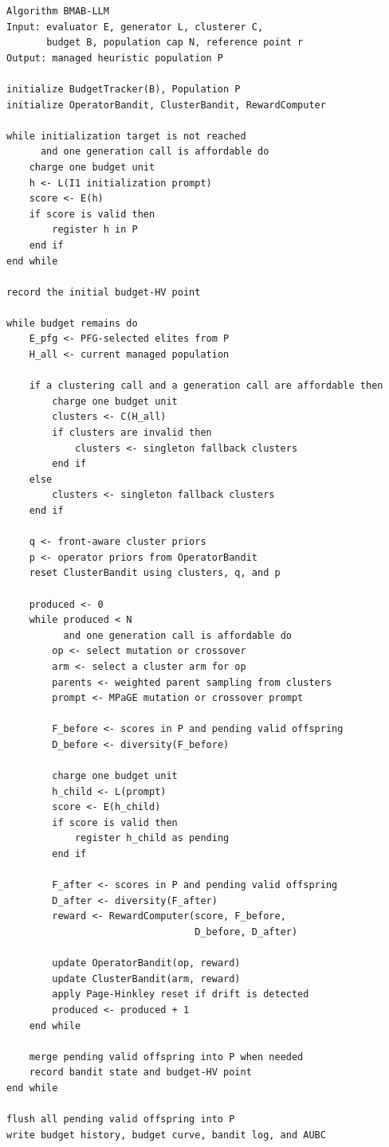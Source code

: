 \documentclass[../main.tex]{subfiles}
\begin{document}
\begin{lstlisting}[language={},caption={High-level BMAB-LLM workflow.},label={lst:bmab-algorithm}]
Algorithm BMAB-LLM
Input: evaluator E, generator L, clusterer C,
       budget B, population cap N, reference point r
Output: managed heuristic population P

initialize BudgetTracker(B), Population P
initialize OperatorBandit, ClusterBandit, RewardComputer

while initialization target is not reached
      and one generation call is affordable do
    charge one budget unit
    h <- L(I1 initialization prompt)
    score <- E(h)
    if score is valid then
        register h in P
    end if
end while

record the initial budget-HV point

while budget remains do
    E_pfg <- PFG-selected elites from P
    H_all <- current managed population

    if a clustering call and a generation call are affordable then
        charge one budget unit
        clusters <- C(H_all)
        if clusters are invalid then
            clusters <- singleton fallback clusters
        end if
    else
        clusters <- singleton fallback clusters
    end if

    q <- front-aware cluster priors
    p <- operator priors from OperatorBandit
    reset ClusterBandit using clusters, q, and p

    produced <- 0
    while produced < N
          and one generation call is affordable do
        op <- select mutation or crossover
        arm <- select a cluster arm for op
        parents <- weighted parent sampling from clusters
        prompt <- MPaGE mutation or crossover prompt

        F_before <- scores in P and pending valid offspring
        D_before <- diversity(F_before)

        charge one budget unit
        h_child <- L(prompt)
        score <- E(h_child)
        if score is valid then
            register h_child as pending
        end if

        F_after <- scores in P and pending valid offspring
        D_after <- diversity(F_after)
        reward <- RewardComputer(score, F_before,
                                 D_before, D_after)

        update OperatorBandit(op, reward)
        update ClusterBandit(arm, reward)
        apply Page-Hinkley reset if drift is detected
        produced <- produced + 1
    end while

    merge pending valid offspring into P when needed
    record bandit state and budget-HV point
end while

flush all pending valid offspring into P
write budget history, budget curve, bandit log, and AUBC
\end{lstlisting}
\end{document}
